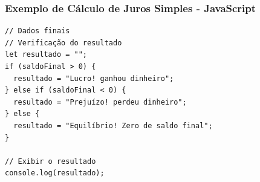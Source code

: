 \documentclass[13pt, xcolor={dvipsnames,svgnames}, portuguese]{beamer}
\begin{document}
\begin{frame}[fragile]
\frametitle{Exemplo de Cálculo de Juros Simples - JavaScript}

\begin{verbatim}
// Dados finais
// Verificação do resultado
let resultado = "";
if (saldoFinal > 0) {
  resultado = "Lucro! ganhou dinheiro";
} else if (saldoFinal < 0) {
  resultado = "Prejuízo! perdeu dinheiro";
} else {
  resultado = "Equilíbrio! Zero de saldo final";
}

// Exibir o resultado
console.log(resultado);

\end{verbatim}

\end{frame}
\end{document}
